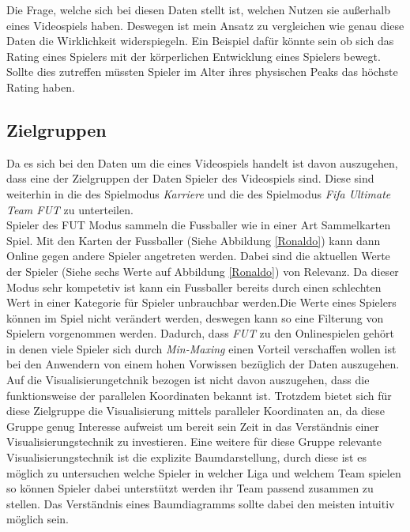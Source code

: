 \documentclass[usegeometry=true]{scrartcl}
\begin{document}

Die Frage, welche sich bei diesen Daten stellt ist, welchen Nutzen sie außerhalb eines Videospiels haben. Deswegen ist mein Ansatz zu vergleichen wie genau diese Daten die Wirklichkeit widerspiegeln. Ein Beispiel dafür könnte sein ob sich das Rating eines Spielers mit der körperlichen Entwicklung eines Spielers bewegt. Sollte dies zutreffen  müssten Spieler im Alter ihres physischen Peaks das höchste Rating haben. 
\subsection{Zielgruppen}
Da es sich bei den Daten um die eines Videospiels handelt ist davon auszugehen, dass eine der Zielgruppen der Daten Spieler des Videospiels sind. Diese sind weiterhin in die des Spielmodus \textit{Karriere} und die des Spielmodus \textit{Fifa Ultimate Team  FUT} zu unterteilen.\\


Spieler des FUT Modus sammeln die Fussballer wie in einer Art Sammelkarten Spiel. Mit den Karten der Fussballer (Siehe Abbildung \ref{Ronaldo}) kann dann Online gegen andere Spieler angetreten werden.
Dabei sind die aktuellen Werte der Spieler (Siehe sechs Werte auf Abbildung \ref{Ronaldo}) von Relevanz. Da dieser Modus sehr kompetetiv ist kann ein Fussballer bereits durch einen schlechten Wert in einer Kategorie für Spieler unbrauchbar werden.Die Werte eines Spielers können im Spiel nicht verändert werden, deswegen kann so eine Filterung von Spielern vorgenommen werden. Dadurch, dass \textit{FUT} zu den Onlinespielen gehört in denen viele Spieler sich durch \textit{Min-Maxing}\cite{noauthor_min-maxing_2014} einen Vorteil verschaffen wollen ist bei den Anwendern von einem hohen Vorwissen bezüglich der Daten auszugehen. Auf die Visualisierungetchnik bezogen ist nicht davon auszugehen, dass die funktionsweise der parallelen Koordinaten bekannt ist. Trotzdem bietet sich für diese Zielgruppe die Visualisierung mittels paralleler Koordinaten an, da diese Gruppe genug Interesse aufweist um bereit sein Zeit in das Verständnis einer Visualisierungstechnik zu investieren. Eine weitere für diese Gruppe relevante Visualisierungstechnik ist die explizite Baumdarstellung, durch diese ist es möglich zu untersuchen welche Spieler in welcher Liga und welchem Team spielen so können Spieler dabei unterstützt werden ihr Team passend zusammen zu stellen. Das Verständnis eines Baumdiagramms sollte dabei den meisten intuitiv möglich sein.\\
\end{document}
